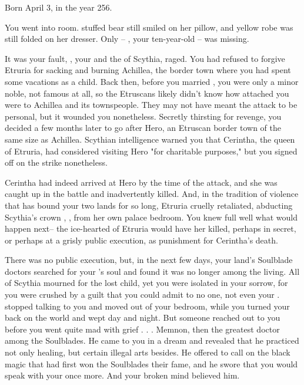 \documentclass[char]{Kos}
\begin{document}
\name{\cScythiaQueen{}}


Born April 3, in the year 256.

You went into \cFugitive{\their} room. \cFugitive{\Their} stuffed bear still smiled on her pillow, and \cFugitive{\their} yellow robe was still folded on her dresser. Only \cFugitive{\they}-- \cFugitive{}, your ten-year-old  \cFugitive{\offspring}-- was missing.

It was your fault, \cScythiaKing{}, your \cScythiaKing{\spouse} and the \cScythiaKing{\monarch} of Scythia, raged. You had refused to forgive Etruria for sacking and burning Achillea, the border town where you had spent some vacations as a child. Back then, before you married \cScythiaKing{}, you were only a minor noble, not famous at all, so the Etruscans likely didn't know how attached you were to Achillea and its townspeople. They may not have meant the attack to be personal, but it wounded you nonetheless. Secretly thirsting for revenge, you decided a few months later to go after Hero, an Etruscan border town of the same size as Achillea. Scythian intelligence warned you that Cerintha, the queen of Etruria, had considered visiting Hero "for charitable purposes," but you signed off on the strike nonetheless. 

Cerintha had indeed arrived at Hero by the time of the attack, and she was caught up in the battle and inadvertently killed. And, in the tradition of violence that has bound your two lands for so long, Etruria cruelly retaliated, abducting Scythia's crown \cFugitive{\prince}, \cFugitive{}, from her own palace bedroom. You knew full well what would happen next-- the ice-hearted \cEtruriaKing{\Monarch} of Etruria would have her killed, perhaps in secret, or perhaps at a grisly public execution, as punishment for Cerintha's death.

There was no public execution, but, in the next few days, your land's Soulblade doctors searched for your \cFugitive{\offspring}'s soul and found it was no longer among the living. All of Scythia mourned for the lost child, yet you were isolated in your sorrow, for you were crushed by a guilt that you could admit to no one, not even your \cScythiaKing{\spouse}.  stopped talking to you and moved out of your bedroom, while you turned your back on the world and wept day and night. But someone reached out to you before you went quite mad with grief . . . Memnon, then the greatest doctor among the Soulblades. He came to you in a dream and revealed that he practiced not only healing, but certain illegal arts besides. He offered to call on the black magic that had first won the Soulblades their fame, and he swore that you would speak with your \cFugitive{\offspring} once more. And your broken mind believed him.
\end{document}
